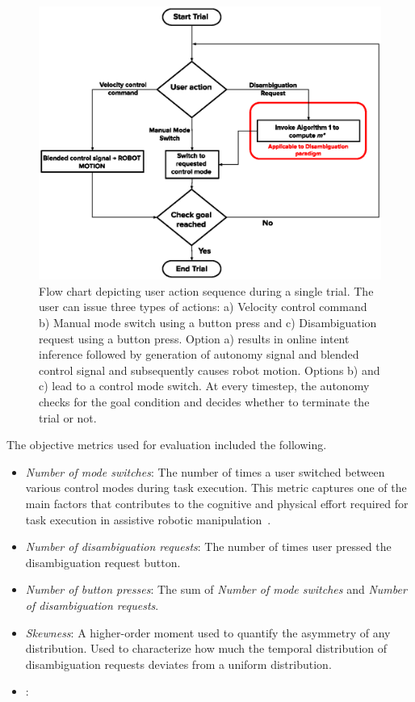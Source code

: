 \documentclass[journal]{IEEEtran}
\begin{document}
\begin{figure}[ht!]
	\centering
	\includegraphics[keepaspectratio, width = 1.\hsize, height = 0.4\vsize, left]{./figures/ExperimentBlockDiagram.eps}
	\caption{Flow chart depicting user action sequence during a single trial. The user can issue three types of actions: a) Velocity control command b) Manual mode switch using a button press and c) Disambiguation request using a button press. Option a) results in online intent inference followed by generation of autonomy signal and blended control signal and subsequently causes robot motion. Options b) and c) lead to a control mode switch. At every timestep, the autonomy checks for the goal condition and decides whether to terminate the trial or not.}
	\label{fig:exp_block_diagram}
\end{figure}

The objective metrics used for evaluation included the following. 
\begin{itemize}
	\item \textit{Number of mode switches}: The number of times a user switched between various control modes during task execution. This metric captures one of the main factors that contributes to the cognitive and physical effort required for task execution in assistive robotic manipulation~\cite{herlant2016assistive}.
	\item \textit{Number of disambiguation requests}: The number of times user pressed the disambiguation request button. 
	\item \textit{Number of button presses}: The sum of \textit{Number of mode switches} and \textit{Number of disambiguation requests}.
	\item \textit{Skewness}: A higher-order moment used to quantify the asymmetry of any distribution. Used to characterize how much the temporal distribution of disambiguation requests deviates from a uniform distribution. 
	\item \textit{}: 
\end{itemize}
\end{document}
